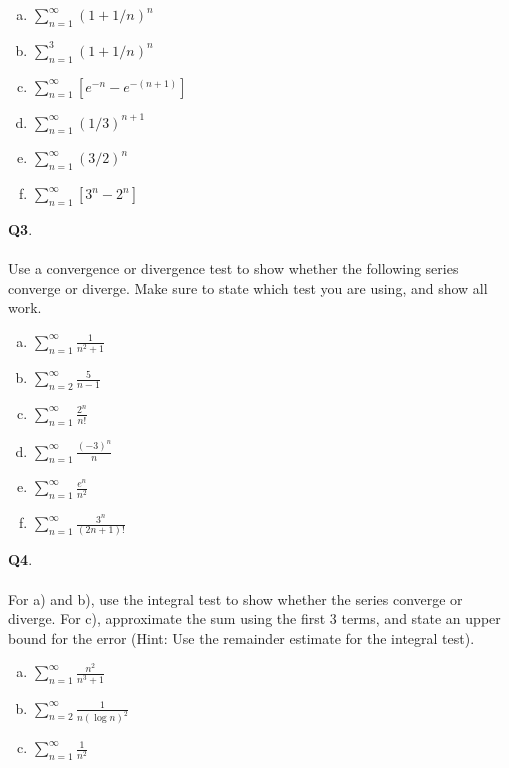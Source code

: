 \documentclass[12pt, oneside]{amsart}
\begin{document}
\begin{enumerate}[a)]
  \item
    $\displaystyle{\sum_{n=1}^{\infty} (1 + 1/n)^{n}}$
    \vspace{6cm}
  \item
    $\displaystyle{\sum_{n=1}^{3} (1 + 1/n)^{n}}$
\vspace{6cm}
\item
  $\sum_{n=1}^{\infty} [e^{-n} - e^{-(n+1)}]$
  \newpage
   \item
     $\sum_{n=1}^{\infty} \displaystyle{(1/3)^{n+1}}$
     \vspace{6cm}
   \item $\sum_{n=1}^{\infty} \displaystyle{(3/2)^{n}}$
  \vspace{6cm}
\item $\sum_{n=1}^{\infty} \displaystyle{[3^{n} - 2^{n}]}$
\end{enumerate}
\newpage
\noindent
\textbf{Q3}. \\ \\ Use a convergence or divergence test to show whether the following series converge or diverge. Make sure to state which test you are using, and show all work. 
\begin{enumerate}[a)]
  \item
$\displaystyle{\sum_{n=1}^{\infty} \frac{1}{n^{2} + 1}}$
    \vspace{6cm}
  \item
$\displaystyle{\sum_{n=2}^{\infty} \frac{5}{n - 1}}$
\vspace{6cm}
\item
  $ \displaystyle{\sum_{n=1}^{\infty} \frac{2^{n}}{n!}}$
  \newpage
\item
  $ \displaystyle{\sum_{n=1}^{\infty} \frac{(-3)^{n}}{n} }$
  \vspace{6cm}
\item
  $ \displaystyle{\sum_{n=1}^{\infty} \frac{e^{n}}{n^{2}} }$
  \vspace{6cm}
\item
  $ \displaystyle{\sum_{n=1}^{\infty} \frac{3^{n}}{(2n +1)!} }$
\end{enumerate}



\newpage
\noindent
\textbf{Q4}. \\ \\ For a) and b), use the integral test to show whether the
series converge or diverge. For c), approximate the sum using the first $3$
terms, and state an upper bound for the error (Hint: Use the remainder estimate
for the integral test).
\begin{enumerate}[a)]
  \item
$\displaystyle{\sum_{n=1}^{\infty} \frac{n^{2}}{n^{3} + 1}}$
    \vspace{6cm}
  \item
    $\displaystyle{\sum_{n=2}^{\infty} \frac{1}{n (\log n)^{2}}}$
\vspace{6cm}
\item
  $ \displaystyle{\sum_{n=1}^{\infty} \frac{{1}}{n^{2}}}$
  \newpage
\end{enumerate}
\end{document}
